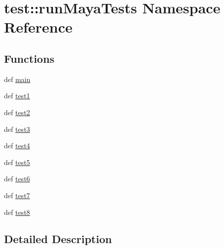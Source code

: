 \hypertarget{namespacetest_1_1runMayaTests}{\section{test\-:\-:run\-Maya\-Tests \-Namespace \-Reference}
\label{d9/d1e/namespacetest_1_1runMayaTests}
}
\subsection*{\-Functions}
\begin{DoxyCompactItemize}
\item 
def \hyperlink{namespacetest_1_1runMayaTests_a632e3ee425e0692f654cc0c42cc8d7b0}{main}
\item 
def \hyperlink{namespacetest_1_1runMayaTests_a3be1672127713652c8c38178d4f5599e}{test1}
\item 
def \hyperlink{namespacetest_1_1runMayaTests_a1cce43b852e1b136d524f24277223130}{test2}
\item 
def \hyperlink{namespacetest_1_1runMayaTests_afafe38ab651de2f153dec070f5f02d24}{test3}
\item 
def \hyperlink{namespacetest_1_1runMayaTests_a13dd3826d7218302bffb35d7c3355a44}{test4}
\item 
def \hyperlink{namespacetest_1_1runMayaTests_ad3e3eda52db2f1b3f0cf82fd0e2fa782}{test5}
\item 
def \hyperlink{namespacetest_1_1runMayaTests_a26111ce34b00b9197451a40836677cd5}{test6}
\item 
def \hyperlink{namespacetest_1_1runMayaTests_ae9d37266dc4532e21cbe1e800d20e2e8}{test7}
\item 
def \hyperlink{namespacetest_1_1runMayaTests_a28007940d818455edc5db51b87ceb4b9}{test8}
\end{DoxyCompactItemize}


\subsection{\-Detailed \-Description}
 

